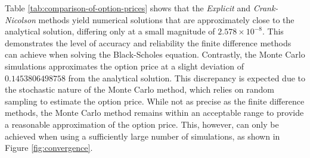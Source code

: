 Table \ref{tab:comparison-of-option-prices} shows that the \textit{Explicit} and \textit{Crank-Nicolson} methods yield numerical solutions that are approximately close to the analytical solution, differing only at a small magnitude of $2.578 \times 10^{-8}$. This demonstrates the level of accuracy and reliability the finite difference methods can achieve when solving the Black-Scholes equation. Contrastly, the Monte Carlo simulations approximates the option price at a slight deviation of $0.1453806498758$ from the analytical solution. This discrepancy is expected due to the stochastic nature of the Monte Carlo method, which relies on random sampling to estimate the option price. While not as precise as the finite difference methods, the Monte Carlo method remains within an acceptable range to provide a reasonable approximation of the option price. This, however, can only be achieved when using a sufficiently large number of simulations, as shown in Figure \ref{fig:convergence}. 


